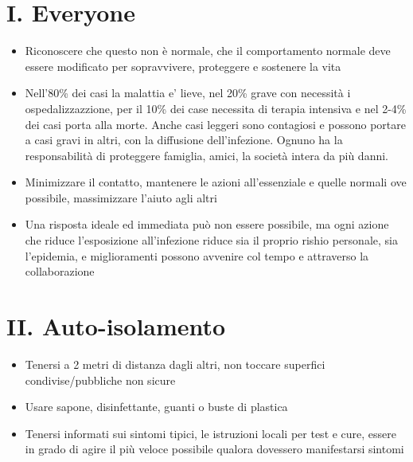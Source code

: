 \documentclass[onecolumn,journal]{IEEEtran}
\begin{document}
\begin{multicols}{2}

\section*{I. Everyone}

\begin{itemize}

\item Riconoscere che questo non è normale, che il comportamento normale deve essere modificato per sopravvivere, proteggere e sostenere la vita

\item Nell'80\% dei casi la malattia e' lieve, nel 20\% grave con necessità i ospedalizzazzione, per il 10\% dei case necessita di terapia intensiva e nel 2-4\% dei casi porta alla morte. Anche casi leggeri sono contagiosi e possono portare a casi gravi in altri, con la diffusione dell'infezione. Ognuno ha la responsabilità di proteggere famiglia, amici, la società intera da più danni.

\item Minimizzare il contatto, mantenere le azioni all'essenziale e quelle normali ove possibile, massimizzare l'aiuto agli altri

\item Una risposta ideale ed immediata può non essere possibile, ma ogni azione che riduce l'esposizione all'infezione riduce sia il proprio rishio personale, sia l'epidemia, e miglioramenti possono avvenire col tempo e attraverso la collaborazione

\end{itemize}

\section*{II. Auto-isolamento}

\begin{itemize}
\item Tenersi a 2 metri di distanza dagli altri, non toccare superfici condivise/pubbliche non sicure

\item Usare sapone, disinfettante, guanti o buste di plastica

\item Tenersi informati sui sintomi tipici, le istruzioni locali per test e cure, essere in grado di agire il più veloce possibile qualora dovessero manifestarsi sintomi


\end{itemize}
\end{multicols}
\end{document}
